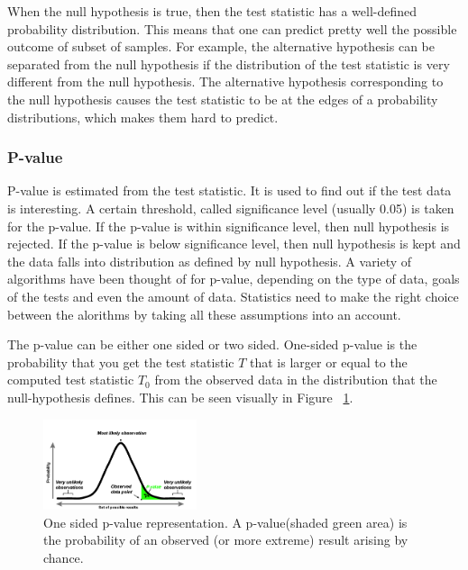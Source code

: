 \documentclass[12pt]{article}
\begin{document}
When the null hypothesis is true, then the test statistic has a well-defined probability distribution. This means that one can predict pretty well the possible outcome of subset of samples. For example, the alternative hypothesis can be separated from the null hypothesis if the distribution of the test statistic is very different from the null hypothesis. The alternative hypothesis corresponding to the null hypothesis causes the test statistic to be at the edges of a probability distributions, which makes them hard to predict.

\subsubsection{P-value}
P-value is estimated from the test statistic. It is used to find out if the test data is interesting. A certain threshold, called significance level (usually 0.05) is taken for the p-value. If the p-value is within significance level, then null hypothesis is rejected. If the p-value is below significance level, then null hypothesis is kept and the data falls into distribution as defined by null hypothesis. A variety of algorithms have been thought of for p-value, depending on the type of data, goals of the tests and even the amount of data. Statistics need to make the right choice between the alorithms by taking all these assumptions into an account.

The p-value can be either one sided or two sided. One-sided p-value is the probability that you get the test statistic $T$ that is larger or equal to the computed test statistic $T_0$ from the observed data in the distribution that the null-hypothesis defines. This can be seen visually in Figure ~\ref{fig:p_value_one_sided}.

\begin{figure}[H]
  \centering
  \includegraphics[width=0.4\textwidth]{p_value_one_sided}
  \caption{One sided p-value representation. A p-value(shaded green area) is the probability of an observed (or more extreme) result arising by chance. ~\cite{p_value_pic_cite}}
  \label{fig:p_value_one_sided}
\end{figure}
\end{document}
